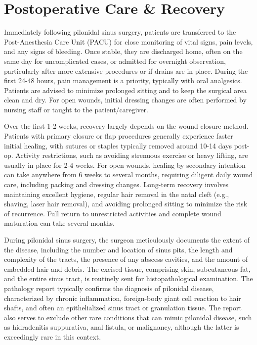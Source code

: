 \section*{Postoperative Care \& Recovery}
Immediately following pilonidal sinus surgery, patients are transferred to the Post-Anesthesia Care Unit (PACU) for close monitoring of vital signs, pain levels, and any signs of bleeding. Once stable, they are discharged home, often on the same day for uncomplicated cases, or admitted for overnight observation, particularly after more extensive procedures or if drains are in place. During the first 24-48 hours, pain management is a priority, typically with oral analgesics. Patients are advised to minimize prolonged sitting and to keep the surgical area clean and dry. For open wounds, initial dressing changes are often performed by nursing staff or taught to the patient/caregiver.

Over the first 1-2 weeks, recovery largely depends on the wound closure method. Patients with primary closure or flap procedures generally experience faster initial healing, with sutures or staples typically removed around 10-14 days post-op. Activity restrictions, such as avoiding strenuous exercise or heavy lifting, are usually in place for 2-4 weeks. For open wounds, healing by secondary intention can take anywhere from 6 weeks to several months, requiring diligent daily wound care, including packing and dressing changes. Long-term recovery involves maintaining excellent hygiene, regular hair removal in the natal cleft (e.g., shaving, laser hair removal), and avoiding prolonged sitting to minimize the risk of recurrence. Full return to unrestricted activities and complete wound maturation can take several months.

During pilonidal sinus surgery, the surgeon meticulously documents the extent of the disease, including the number and location of sinus pits, the length and complexity of the tracts, the presence of any abscess cavities, and the amount of embedded hair and debris. The excised tissue, comprising skin, subcutaneous fat, and the entire sinus tract, is routinely sent for histopathological examination. The pathology report typically confirms the diagnosis of pilonidal disease, characterized by chronic inflammation, foreign-body giant cell reaction to hair shafts, and often an epithelialized sinus tract or granulation tissue. The report also serves to exclude other rare conditions that can mimic pilonidal disease, such as hidradenitis suppurativa, anal fistula, or malignancy, although the latter is exceedingly rare in this context.

